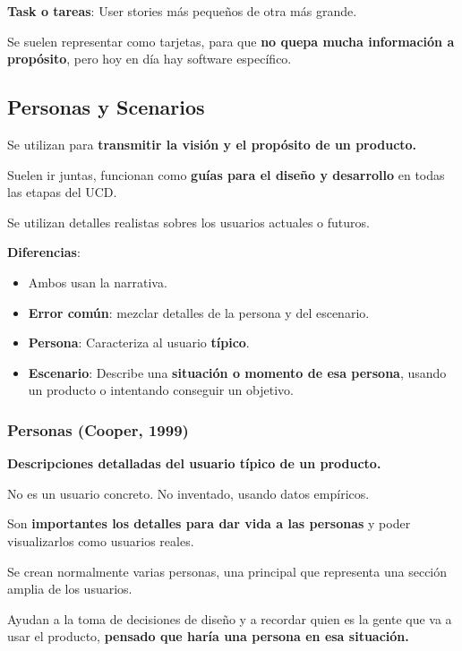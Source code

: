 \textbf{Task o tareas}: User stories más pequeños de otra más grande.

Se suelen representar como tarjetas, para que \textbf{no quepa mucha
información a propósito}, pero hoy en día hay software específico.

\hypertarget{personas-y-scenarios}{%
\subsection{Personas y Scenarios}\label{personas-y-scenarios}}

Se utilizan para \textbf{transmitir la visión y el propósito de un
producto.}

Suelen ir juntas, funcionan como \textbf{guías para el diseño y
desarrollo} en todas las etapas del UCD.

Se utilizan detalles realistas sobres los usuarios actuales o futuros.

\textbf{Diferencias}:

\begin{itemize}
\tightlist
\item
  Ambos usan la narrativa.
\item
  \textbf{Error común}: mezclar detalles de la persona y del escenario.
\item
  \textbf{Persona}: Caracteriza al usuario \textbf{típico}.
\item
  \textbf{Escenario}: Describe una \textbf{situación o momento de esa
  persona}, usando un producto o intentando conseguir un objetivo.
\end{itemize}

\hypertarget{personas-cooper-1999}{%
\subsubsection{Personas (Cooper, 1999)}\label{personas-cooper-1999}}

\textbf{Descripciones detalladas del usuario típico de un producto.}

No es un usuario concreto. No inventado, usando datos empíricos.

Son \textbf{importantes los detalles para dar vida a las personas} y
poder visualizarlos como usuarios reales.

Se crean normalmente varias personas, una principal que representa una
sección amplia de los usuarios.

Ayudan a la toma de decisiones de diseño y a recordar quien es la gente
que va a usar el producto, \textbf{pensado que haría una persona en esa
situación.}

